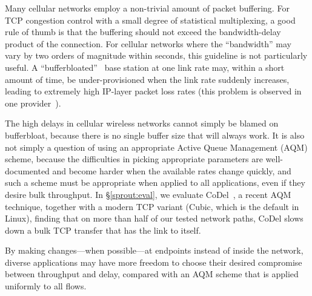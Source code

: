 
Many cellular networks employ a non-trivial amount of packet
buffering. For TCP congestion control with a small degree of
statistical multiplexing, a good rule of thumb is that the buffering
should not exceed the bandwidth-delay product of the connection. For
cellular networks where the ``bandwidth'' may vary by two orders of
magnitude within seconds, this guideline is not particularly useful. A
``bufferbloated''~\cite{bufferbloat} base station at one link rate
may, within a short amount of time, be under-provisioned when the link
rate suddenly increases, leading to extremely high IP-layer packet
loss rates (this problem is observed in one
provider~\cite{Mahajan12}).

The high delays in cellular wireless networks cannot simply be blamed
on bufferbloat, because there is no single buffer size that will
always work. It is also not simply a question of using an appropriate
Active Queue Management (AQM) scheme, because the difficulties in
picking appropriate parameters are well-documented and become harder
when the available rates change quickly, and such a scheme must be
appropriate when applied to all applications, even if they desire bulk
throughput. In \S\ref{sprout:eval}, we evaluate CoDel~\cite{CoDel}, a
recent AQM technique, together with a modern TCP variant (Cubic, which
is the default in Linux), finding that on more than half of our tested
network paths, CoDel slows down a bulk TCP transfer that has the link
to itself.
%

By making changes---when possible---at endpoints
instead of inside the network, diverse applications may have more
freedom to choose their desired compromise between throughput and
delay, compared with an AQM scheme that is applied uniformly to all
flows.


